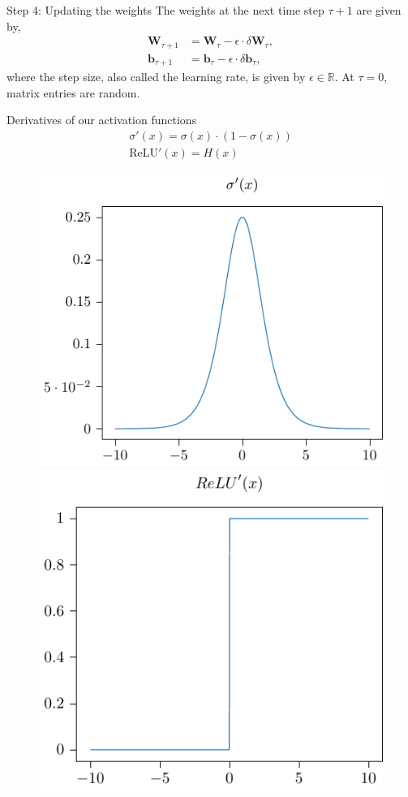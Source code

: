 \documentclass{beamer}
\begin{document}
		\begin{frame}{Step 4: Updating the weights}
		The weights at the next time step $\tau + 1$ are given by,
		\begin{align*}
			\mathbf{W}_{\tau + 1} &= \mathbf{W}_\tau - \epsilon \cdot \delta\mathbf{W}_{\tau}, \\
			\mathbf{b}_{\tau + 1} &= \mathbf{b}_{\tau} - \epsilon \cdot \delta\mathbf{b}_{\tau},
			 \end{align*}
			where the step size, also called the learning rate, is given by $\epsilon \in \mathbb{R}$. At $\tau = 0$, matrix entries are random.
    \end{frame}
%
    \begin{frame}{Derivatives of our activation functions}
      \begin{align}
        \sigma'(x) = \sigma(x) \cdot (1 - \sigma(x)) \\
        \text{ReLU}'(x) = H(x) 
      \end{align}
      \begin{figure}
				\includegraphics[width=0.49\linewidth]{./figures/sigmoid_prime.pdf} 
				\includegraphics[width=0.447\linewidth]{./figures/relu_prime.pdf} 
      \end{figure}
    \end{frame}
\end{document}
